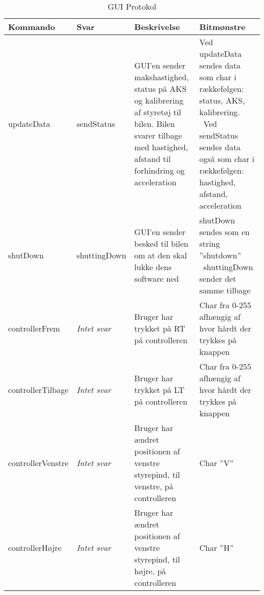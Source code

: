 \begin{table}[h]
\begin{tabularx}{\textwidth}{| Z | Z | Z | Z |} \hline

\textbf{Kommando} 						&
\textbf{Svar}							&
\textbf{Beskrivelse}					&
\textbf{Bitmønstre}						\\ \hline

updateData &

sendStatus &

GUI'en sender makshastighed, status på AKS og kalibrering af styretøj til bilen. Bilen svarer tilbage med hastighed, afstand til forhindring og acceleration &

Ved updateData sendes data som char i rækkefølgen: status, AKS, kalibrering. \
Ved sendStatus sendes data også som char i rækkefølgen: hastighed, afstand, acceleration \\ \hline



shutDown &

shuttingDown &

GUI'en sender besked til bilen om at den skal lukke dens software ned &

shutDown sendes som en string ''shutdown'' \
shuttingDown sender det samme tilbage \\ \hline



controllerFrem &

\textit{Intet svar} &

Bruger har trykket på RT på controlleren &

Char fra 0-255 afhængig af hvor hårdt der trykkes på knappen \\ \hline



controllerTilbage &

\textit{Intet svar} &

Bruger har trykket på LT på controlleren &

Char fra 0-255 afhængig af hvor hårdt der trykkes på knappen \\ \hline



controllerVenstre &

\textit{Intet svar} &

Bruger har ændret positionen af venstre styrepind, til venstre, på controlleren &

Char ''V'' \\ \hline



controllerHøjre &

\textit{Intet svar} &

Bruger har ændret positionen af venstre styrepind, til højre, på controlleren &

Char ''H'' \\ \hline

\end{tabularx}
\caption{GUI Protokol}
\label{tbl:prt_gui}
\end{table}
